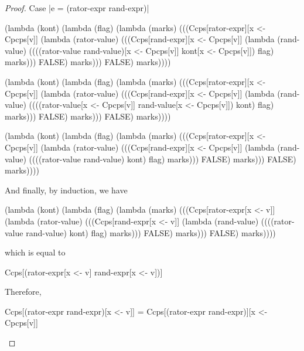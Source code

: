 \begin{proof}{Case \scheme|e = (rator-expr rand-expr)|}
\begin{schemeblock}
\begin{schemedisplay}
(lambda (kont)
   (lambda (flag)
     (lambda (marks)
       (((Ccps[rator-expr][x <- Cpcps[v]]
          (lambda (rator-value)
            (((Ccps[rand-expr][x <- Cpcps[v]]
               (lambda (rand-value)
                 ((((rator-value rand-value)[x <- Cpcps[v]] kont[x <- Cpcps[v]]) flag) marks)))
              FALSE) marks)))
         FALSE) marks))))
\end{schemedisplay}
\end{schemeblock}

\begin{schemeblock}
\begin{schemedisplay}
(lambda (kont)
   (lambda (flag)
     (lambda (marks)
       (((Ccps[rator-expr][x <- Cpcps[v]]
          (lambda (rator-value)
            (((Ccps[rand-expr][x <- Cpcps[v]]
               (lambda (rand-value)
                 ((((rator-value[x <- Cpcps[v]] rand-value[x <- Cpcps[v]]) kont) flag) marks)))
              FALSE) marks)))
         FALSE) marks))))
\end{schemedisplay}
\end{schemeblock}

\begin{schemeblock}
\begin{schemedisplay}
(lambda (kont)
   (lambda (flag)
     (lambda (marks)
       (((Ccps[rator-expr][x <- Cpcps[v]]
          (lambda (rator-value)
            (((Ccps[rand-expr][x <- Cpcps[v]]
               (lambda (rand-value)
                 ((((rator-value rand-value) kont) flag) marks)))
              FALSE) marks)))
         FALSE) marks))))
\end{schemedisplay}
\end{schemeblock}

And finally, by induction, we have
\begin{schemeblock}
\begin{schemedisplay}
(lambda (kont)
   (lambda (flag)
     (lambda (marks)
       (((Ccps[rator-expr[x <- v]]
          (lambda (rator-value)
            (((Ccps[rand-expr[x <- v]]
               (lambda (rand-value)
                 ((((rator-value rand-value) kont) flag) marks)))
              FALSE) marks)))
         FALSE) marks))))
\end{schemedisplay}
\end{schemeblock}
which is equal to
\begin{schemeblock}
\begin{schemedisplay}
Ccps[(rator-expr[x <- v] rand-expr[x <- v])]
\end{schemedisplay}
\end{schemeblock}

Therefore,
\begin{schemeblock}
\begin{schemedisplay}
Ccps[(rator-expr rand-expr)[x <- v]] = Ccps[(rator-expr rand-expr)][x <- Cpcps[v]]
\end{schemedisplay}
\end{schemeblock}
\end{proof}

